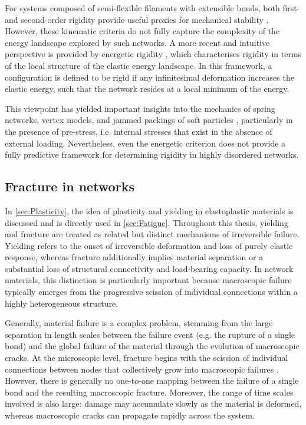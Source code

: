 For systems composed of semi-flexible filaments with extensible bonds, both first- and second-order rigidity provide useful proxies for mechanical stability \cite{van_hecke_jamming_2010}. However, these kinematic criteria do not fully capture the complexity of the energy landscape explored by such networks. A more recent and intuitive perspective is provided by energetic rigidity \cite{damavandi_energetic_2022}, which characterises rigidity in terms of the local structure of the elastic energy landscape. In this framework, a configuration is defined to be rigid if any infinitesimal deformation increases the elastic energy, such that the network resides at a local minimum of the energy.

This viewpoint has yielded important insights into the mechanics of spring networks, vertex models, and jammed packings of soft particles \cite{damavandi_energetic_2022-1}, particularly in the presence of pre-stress, i.e. internal stresses that exist in the absence of external loading. Nevertheless, even the energetic criterion does not provide a fully predictive framework for determining rigidity in highly disordered networks.

\subsection{Fracture in networks}\label{sec:Fracture}
In \cref{sec:Plasticity}, the idea of plasticity and yielding in elastoplastic materials is discussed and is directly used in \cref{sec:Fatigue}. Throughout this thesis, yielding and fracture are treated as related but distinct mechanisms of irreversible failure. Yielding refers to the onset of irreversible deformation and loss of purely elastic response, whereas fracture additionally implies material separation or a substantial loss of structural connectivity and load-bearing capacity. In network materials, this distinction is particularly important because macroscopic failure typically emerges from the progressive scission of individual connections within a highly heterogeneous structure.

Generally, material failure is a complex problem, stemming from the large separation in length scales between the failure event (e.g. the rupture of a single bond) and the global failure of the material through the evolution of macroscopic cracks. At the microscopic level, fracture begins with the scission of individual connections between nodes that collectively grow into macroscopic failures \cite{Creton50th2017,ju_role_nodate,sanner_less_2025,higuchi_fracture_2018,bonnDelayedFractureInhomogeneous1998,teece_gels_2014}. However, there is generally no one-to-one mapping between the failure of a single bond and the resulting macroscopic fracture. Moreover, the range of time scales involved is also large: damage may accumulate slowly as the material is deformed, whereas macroscopic cracks can propagate rapidly across the system.

